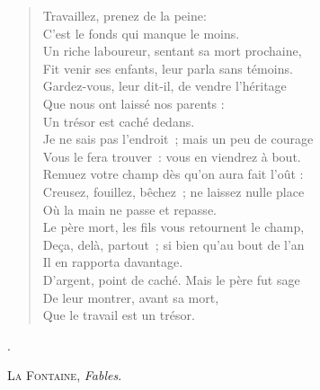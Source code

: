 \documentclass[14pt,a4paper,french]{scrartcl}
\begin{document}
\settowidth{\versewidth}{Un riche laboureur, sentant sa mort prochaine,}

\begin{verse}
\vin Travaillez, prenez de la peine:\\
\vin C'est le fonds\footnotemark{} qui manque le moins.\\
Un riche laboureur, sentant sa mort prochaine,\\
Fit venir ses enfants, leur parla sans témoins.\\
Gardez-vous, leur dit-il, de vendre l'héritage\\
\vin Que nous ont laissé nos parents :\\
\vin Un trésor est caché dedans.\\
Je ne sais pas l'endroit ; mais un peu de courage\\
Vous le fera trouver : vous en viendrez à bout.\\
Remuez votre champ dès qu'on aura fait l'oût :\\
Creusez, fouillez, bêchez ; ne laissez nulle place\\
\vin Où la main ne passe et repasse.\\
Le père mort, les fils vous retournent le champ,\\
Deça, delà, partout ; si bien qu'au bout de l'an\\
\vin Il en rapporta davantage.\\
D'argent, point de caché. Mais le père fut sage\\
\vin De leur montrer, avant sa mort,\\
\vin Que le travail est un trésor.
\end{verse}.

\begin{flushright}
\large
\textsc{La Fontaine}, \textit{Fables}.
\end{flushright}

\end{document}
